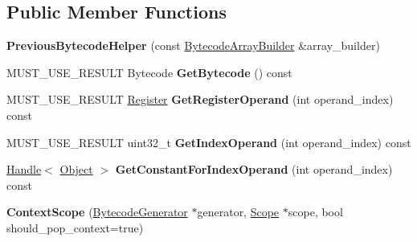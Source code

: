 \subsection*{Public Member Functions}
\begin{DoxyCompactItemize}
\item 
{\bfseries Previous\+Bytecode\+Helper} (const \hyperlink{classv8_1_1internal_1_1interpreter_1_1_bytecode_array_builder}{Bytecode\+Array\+Builder} \&array\+\_\+builder)\hypertarget{classv8_1_1internal_1_1interpreter_1_1_b_a_s_e___e_m_b_e_d_d_e_d_ae681df10dbfeafd926e8f693ade19d37}{}\label{classv8_1_1internal_1_1interpreter_1_1_b_a_s_e___e_m_b_e_d_d_e_d_ae681df10dbfeafd926e8f693ade19d37}

\item 
M\+U\+S\+T\+\_\+\+U\+S\+E\+\_\+\+R\+E\+S\+U\+LT Bytecode {\bfseries Get\+Bytecode} () const \hypertarget{classv8_1_1internal_1_1interpreter_1_1_b_a_s_e___e_m_b_e_d_d_e_d_a8984dfd2a23834aeb48a7ba712247fe3}{}\label{classv8_1_1internal_1_1interpreter_1_1_b_a_s_e___e_m_b_e_d_d_e_d_a8984dfd2a23834aeb48a7ba712247fe3}

\item 
M\+U\+S\+T\+\_\+\+U\+S\+E\+\_\+\+R\+E\+S\+U\+LT \hyperlink{classv8_1_1internal_1_1interpreter_1_1_register}{Register} {\bfseries Get\+Register\+Operand} (int operand\+\_\+index) const \hypertarget{classv8_1_1internal_1_1interpreter_1_1_b_a_s_e___e_m_b_e_d_d_e_d_a13e87c55bb2898707b5e5667d81293d6}{}\label{classv8_1_1internal_1_1interpreter_1_1_b_a_s_e___e_m_b_e_d_d_e_d_a13e87c55bb2898707b5e5667d81293d6}

\item 
M\+U\+S\+T\+\_\+\+U\+S\+E\+\_\+\+R\+E\+S\+U\+LT uint32\+\_\+t {\bfseries Get\+Index\+Operand} (int operand\+\_\+index) const \hypertarget{classv8_1_1internal_1_1interpreter_1_1_b_a_s_e___e_m_b_e_d_d_e_d_adc34c4c5a2595ac884e9b679a1290335}{}\label{classv8_1_1internal_1_1interpreter_1_1_b_a_s_e___e_m_b_e_d_d_e_d_adc34c4c5a2595ac884e9b679a1290335}

\item 
\hyperlink{classv8_1_1internal_1_1_handle}{Handle}$<$ \hyperlink{classv8_1_1internal_1_1_object}{Object} $>$ {\bfseries Get\+Constant\+For\+Index\+Operand} (int operand\+\_\+index) const \hypertarget{classv8_1_1internal_1_1interpreter_1_1_b_a_s_e___e_m_b_e_d_d_e_d_a530fe813c41ae448a923e9ca9eba95a8}{}\label{classv8_1_1internal_1_1interpreter_1_1_b_a_s_e___e_m_b_e_d_d_e_d_a530fe813c41ae448a923e9ca9eba95a8}

\item 
{\bfseries Context\+Scope} (\hyperlink{classv8_1_1internal_1_1interpreter_1_1_bytecode_generator}{Bytecode\+Generator} $\ast$generator, \hyperlink{classv8_1_1internal_1_1_scope}{Scope} $\ast$scope, bool should\+\_\+pop\+\_\+context=true)\hypertarget{classv8_1_1internal_1_1interpreter_1_1_b_a_s_e___e_m_b_e_d_d_e_d_accd80da5d4cc1636366e7930dc5108f3}{}\label{classv8_1_1internal_1_1interpreter_1_1_b_a_s_e___e_m_b_e_d_d_e_d_accd80da5d4cc1636366e7930dc5108f3}


\end{DoxyCompactItemize}
